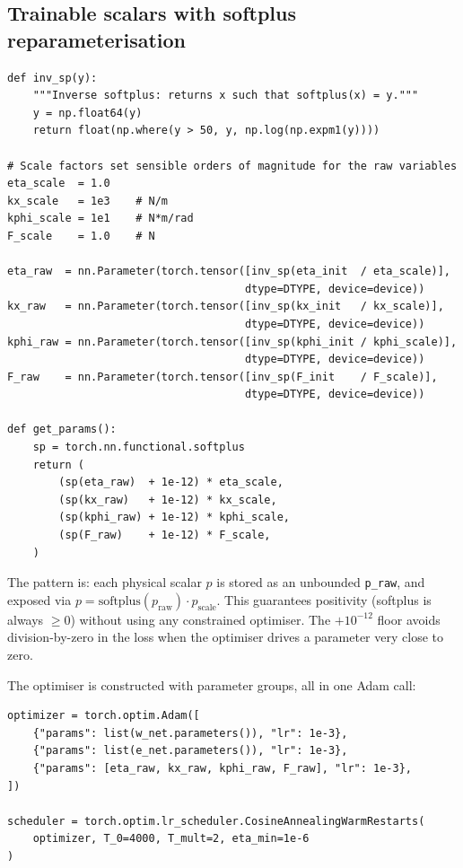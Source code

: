 \documentclass[11pt,a4paper]{article}
\begin{document}
\subsection{Trainable scalars with softplus reparameterisation}

\begin{lstlisting}[caption={Scalar parameters with positivity enforcement}]
def inv_sp(y):
    """Inverse softplus: returns x such that softplus(x) = y."""
    y = np.float64(y)
    return float(np.where(y > 50, y, np.log(np.expm1(y))))

# Scale factors set sensible orders of magnitude for the raw variables
eta_scale  = 1.0
kx_scale   = 1e3    # N/m
kphi_scale = 1e1    # N*m/rad
F_scale    = 1.0    # N

eta_raw  = nn.Parameter(torch.tensor([inv_sp(eta_init  / eta_scale)],
                                     dtype=DTYPE, device=device))
kx_raw   = nn.Parameter(torch.tensor([inv_sp(kx_init   / kx_scale)],
                                     dtype=DTYPE, device=device))
kphi_raw = nn.Parameter(torch.tensor([inv_sp(kphi_init / kphi_scale)],
                                     dtype=DTYPE, device=device))
F_raw    = nn.Parameter(torch.tensor([inv_sp(F_init    / F_scale)],
                                     dtype=DTYPE, device=device))

def get_params():
    sp = torch.nn.functional.softplus
    return (
        (sp(eta_raw)  + 1e-12) * eta_scale,
        (sp(kx_raw)   + 1e-12) * kx_scale,
        (sp(kphi_raw) + 1e-12) * kphi_scale,
        (sp(F_raw)    + 1e-12) * F_scale,
    )
\end{lstlisting}

The pattern is: each physical scalar $p$ is stored as an unbounded \texttt{p\_raw}, and exposed via $p = \text{softplus}(p_\text{raw}) \cdot p_\text{scale}$. This guarantees positivity (softplus is always $\geq 0$) without using any constrained optimiser. The $+10^{-12}$ floor avoids division-by-zero in the loss when the optimiser drives a parameter very close to zero.

The optimiser is constructed with parameter groups, all in one Adam call:

\begin{lstlisting}[caption={Single Adam optimizer over all trainable parameters}]
optimizer = torch.optim.Adam([
    {"params": list(w_net.parameters()), "lr": 1e-3},
    {"params": list(e_net.parameters()), "lr": 1e-3},
    {"params": [eta_raw, kx_raw, kphi_raw, F_raw], "lr": 1e-3},
])

scheduler = torch.optim.lr_scheduler.CosineAnnealingWarmRestarts(
    optimizer, T_0=4000, T_mult=2, eta_min=1e-6
)
\end{lstlisting}
\end{document}
